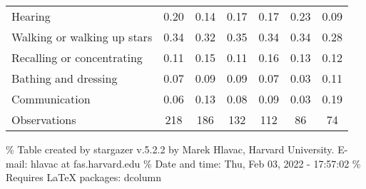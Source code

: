 \documentclass[
]{article}
\begin{document}
\begin{table}
\begin{tabular}[t]{lcccccc}
\hspace{1em}Hearing & 0.20 & 0.14 & 0.17 & 0.17 & 0.23 & 0.09\\
\hspace{1em}Walking or walking up stars & 0.34 & 0.32 & 0.35 & 0.34 & 0.34 & 0.28\\
\hspace{1em}Recalling or concentrating & 0.11 & 0.15 & 0.11 & 0.16 & 0.13 & 0.12\\
\hspace{1em}Bathing and dressing & 0.07 & 0.09 & 0.09 & 0.07 & 0.03 & 0.11\\
\hspace{1em}Communication & 0.06 & 0.13 & 0.08 & 0.09 & 0.03 & 0.19\\
Observations & 218 & 186 & 132 & 112 & 86 & 74\\
\bottomrule
\end{tabular}
\end{table}

\% Table created by stargazer v.5.2.2 by Marek Hlavac, Harvard
University. E-mail: hlavac at fas.harvard.edu \% Date and time: Thu, Feb
03, 2022 - 17:57:02 \% Requires LaTeX packages: dcolumn
\end{document}
